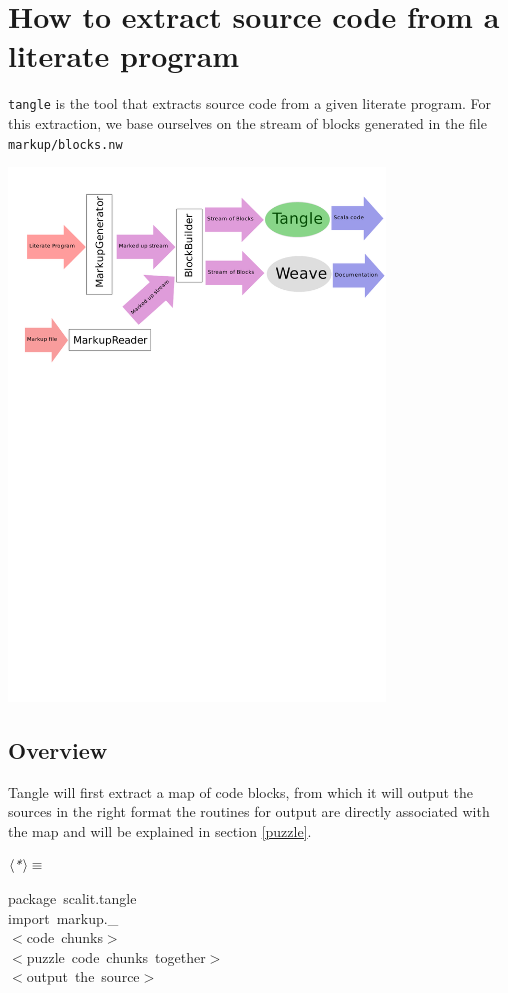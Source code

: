 \documentclass[a4paper,12pt]{article}
\begin{document}
\section{How to extract source code from a literate program}
\texttt{tangle} is the tool that extracts source code from a given literate
program. For this extraction, we base ourselves on the stream of blocks
generated in the file \texttt{markup/blocks.nw}

\includegraphics[width=10cm,viewport=310 710 600 800,clip]{images/tangle}

\subsection{Overview}
Tangle will first extract a map of code blocks, from which it will
output the sources in the right format the routines for output are
directly associated with the map and will be explained in section
\ref{puzzle}.

$\left<\mbox{\emph{*}}\right>\equiv$
\begin{program}{\vem package}~scalit.tangle
\\{\vem import}~markup.\_
\\[0.5em]$<$code~chunks$>$
\\[0.5em]$<$puzzle~code~chunks~together$>$
\\[0.5em]$<$output~the~source$>$
\\[0.5em]\end{program}
\end{document}
